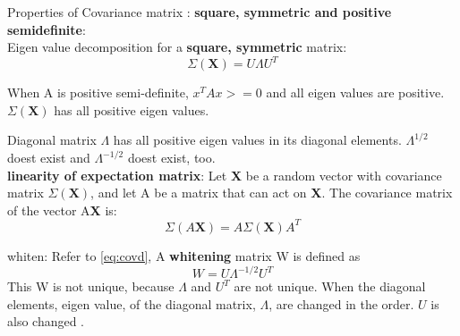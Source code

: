 \documentclass[a4paper,12pt]{article}
\begin{document}
\begin{compactitem}
\item Properties of Covariance matrix : 
\textbf{square, symmetric and positive semidefinite}: \\
Eigen value decomposition for a \textbf{square, symmetric} matrix: 
\begin{equation}
\label{eq:covd}
\Sigma(\textbf{X}) = U\Lambda U^T
\end{equation}


When A is positive semi-definite, $x^T A x >= 0$ and all eigen values are positive.  $\Sigma(\textbf{X})$ has all positive eigen values.

Diagonal matrix $\Lambda$ has all positive eigen values in its diagonal elements. $\Lambda ^ {1/2}$ doest exist and $\Lambda ^ {-1/2}$ doest exist, too.\\

\textbf{linearity of expectation matrix}: Let \textbf{X} be a random vector with covariance matrix
$\Sigma(\textbf{X})$, and let A be a matrix that can act on \textbf{X}. The covariance matrix of the vector A\textbf{X} is:
\begin{equation}
\label{eq:covlinear}
\Sigma(A\textbf{X}) = A\Sigma(\textbf{X})A^{T}
\end{equation}

\item whiten: Refer to \eqref{eq:covd},  A \textbf{whitening} matrix W is defined as
\begin{equation}
\label{eq:whitem}
W=U\Lambda^{-1/2} U^{T}
\end{equation}
This W is not unique, because $\Lambda$ and $U^T$ are not unique.
When the diagonal elements, eigen value, of the diagonal matrix, $\Lambda$, are changed in the order.
$U$ is also changed .


\end{compactitem}
\end{document}
